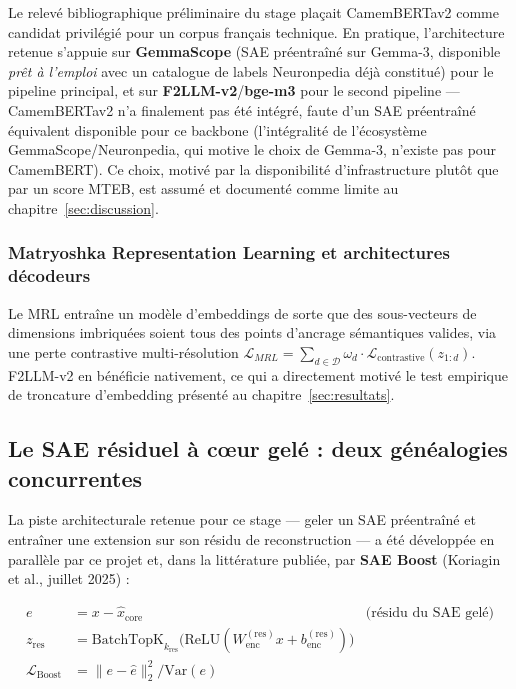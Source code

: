 \documentclass[11pt]{article}
\newcommand{\Var}{\mathrm{Var}}
\begin{document}
\begin{diagnosticbox}
Le relevé bibliographique préliminaire du stage plaçait CamemBERTav2 comme
candidat privilégié pour un corpus français technique. En pratique,
l'architecture retenue s'appuie sur \textbf{GemmaScope} (SAE préentraîné sur
Gemma-3, disponible \emph{prêt à l'emploi} avec un catalogue de labels
Neuronpedia déjà constitué) pour le pipeline principal, et sur
\textbf{F2LLM-v2}/\textbf{bge-m3} pour le second pipeline --- CamemBERTav2 n'a
finalement pas été intégré, faute d'un SAE préentraîné équivalent disponible
pour ce backbone (l'intégralité de l'écosystème GemmaScope/Neuronpedia, qui
motive le choix de Gemma-3, n'existe pas pour CamemBERT). Ce choix, motivé par
la disponibilité d'infrastructure plutôt que par un score MTEB, est assumé et
documenté comme limite au chapitre~\ref{sec:discussion}.
\end{diagnosticbox}

\subsubsection{Matryoshka Representation Learning et architectures décodeurs}
Le MRL \cite{kusupati2022mrl} entraîne un modèle d'embeddings de sorte que des
sous-vecteurs de dimensions imbriquées soient tous des points d'ancrage
sémantiques valides, via une perte contrastive multi-résolution
$\mathcal{L}_{MRL} = \sum_{d \in \mathcal{D}} \omega_d \cdot \mathcal{L}_\text{contrastive}(z_{1:d})$.
F2LLM-v2 en bénéficie nativement, ce qui a directement motivé le test empirique
de troncature d'embedding présenté au chapitre~\ref{sec:resultats}.

\subsection{Le SAE résiduel à cœur gelé : deux généalogies concurrentes}
\label{subsec:sae-boost-litt}

La piste architecturale retenue pour ce stage --- geler un SAE préentraîné et
entraîner une extension sur son résidu de reconstruction --- a été développée
en parallèle par ce projet et, dans la littérature publiée, par
\textbf{SAE Boost} \cite{koriagin2025saeboost} (Koriagin et al., juillet 2025) :

\begin{align*}
  e &= x - \hat{x}_\text{core} & \text{(résidu du SAE gelé)} \\
  z_\text{res} &= \text{BatchTopK}_{k_\text{res}}\bigl(\text{ReLU}(W_\text{enc}^{(\text{res})} x + b_\text{enc}^{(\text{res})})\bigr) \\
  \mathcal{L}_\text{Boost} &= \|e - \hat{e}\|_2^2 / \Var(e)
\end{align*}
\end{document}
